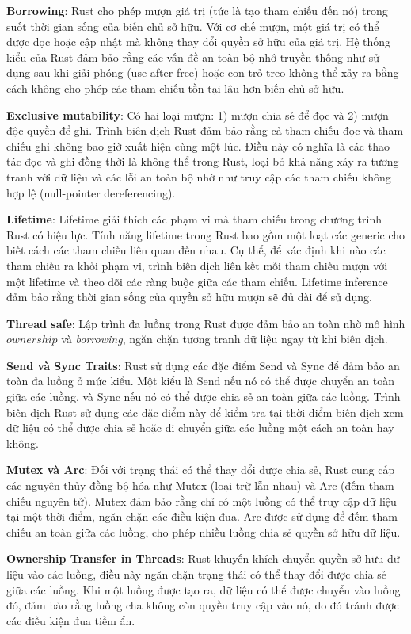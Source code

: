 \textbf{Borrowing}: Rust cho phép mượn giá trị (tức là tạo tham chiếu đến nó) trong suốt thời gian sống của biến chủ sở hữu.
Với cơ chế mượn, một giá trị có thể được đọc hoặc cập nhật mà không thay đổi quyền sở hữu của giá trị.
Hệ thống kiểu của Rust đảm bảo rằng các vấn đề an toàn bộ nhớ truyền thống như sử dụng sau khi giải phóng (use-after-free) hoặc con trỏ treo không thể xảy ra bằng cách không cho phép các tham chiếu tồn tại lâu hơn biến chủ sở hữu.

\textbf{Exclusive mutability}: Có hai loại mượn: 1) mượn chia sẻ để đọc và 2) mượn độc quyền để ghi.
Trình biên dịch Rust đảm bảo rằng cả tham chiếu đọc và tham chiếu ghi không bao giờ xuất hiện cùng một lúc.
Điều này có nghĩa là các thao tác đọc và ghi đồng thời là không thể trong Rust, loại bỏ khả năng xảy ra tương tranh với dữ liệu và các lỗi an toàn bộ nhớ như truy cập các tham chiếu không hợp lệ (null-pointer dereferencing).

\textbf{Lifetime}: Lifetime giải thích các phạm vi mà tham chiếu trong chương trình Rust có hiệu lực.
Tính năng lifetime trong Rust bao gồm một loạt các generic cho biết cách các tham chiếu liên quan đến nhau.
Cụ thể, để xác định khi nào các tham chiếu ra khỏi phạm vi, trình biên dịch liên kết mỗi tham chiếu mượn với một lifetime và theo dõi các ràng buộc giữa các tham chiếu.
Lifetime inference đảm bảo rằng thời gian sống của quyền sở hữu mượn sẽ đủ dài để sử dụng.

\textbf{Thread safe}: Lập trình đa luồng trong Rust được đảm bảo an toàn nhờ mô hình $ownership$ và \textit{borrowing}, ngăn chặn tương tranh dữ liệu ngay từ khi biên dịch.

\textbf{Send và Sync Traits}: Rust sử dụng các đặc điểm Send và Sync để đảm bảo an toàn đa luồng ở mức kiểu.
Một kiểu là Send nếu nó có thể được chuyển an toàn giữa các luồng, và Sync nếu nó có thể được chia sẻ an toàn giữa các luồng.
Trình biên dịch Rust sử dụng các đặc điểm này để kiểm tra tại thời điểm biên dịch xem dữ liệu có thể được chia sẻ hoặc di chuyển giữa các luồng một cách an toàn hay không.

\textbf{Mutex và Arc}: Đối với trạng thái có thể thay đổi được chia sẻ, Rust cung cấp các nguyên thủy đồng bộ hóa như Mutex (loại trừ lẫn nhau) và Arc (đếm tham chiếu nguyên tử).
Mutex đảm bảo rằng chỉ có một luồng có thể truy cập dữ liệu tại một thời điểm, ngăn chặn các điều kiện đua.
Arc được sử dụng để đếm tham chiếu an toàn giữa các luồng, cho phép nhiều luồng chia sẻ quyền sở hữu dữ liệu.

\textbf{Ownership Transfer in Threads}: Rust khuyến khích chuyển quyền sở hữu dữ liệu vào các luồng, điều này ngăn chặn trạng thái có thể thay đổi được chia sẻ giữa các luồng.
Khi một luồng được tạo ra, dữ liệu có thể được chuyển vào luồng đó, đảm bảo rằng luồng cha không còn quyền truy cập vào nó, do đó tránh được các điều kiện đua tiềm ẩn.
